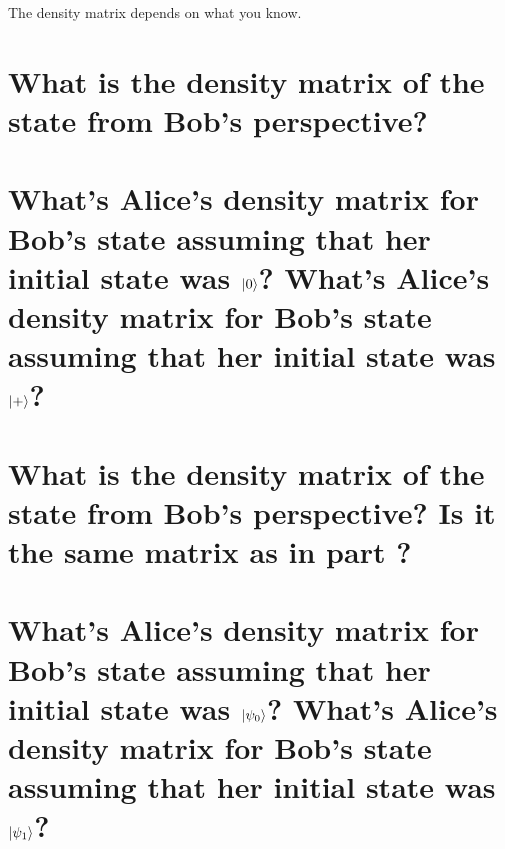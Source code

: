 \documentclass[boxes,pages]{homework}
\begin{document}
\begin{problem}
The density matrix depends on what you know.
\begin{parts}
	\part{What is the density matrix of the state from Bob's perspective?}\label{part:3a}
	\part{What's Alice's density matrix for Bob's state assuming that her initial state was $\ket{0}$? What's Alice's density matrix for Bob's state assuming that her initial state was $\ket{+}$?}\label{part:3b}
	\part{What is the density matrix of the state from Bob's perspective? Is it the same matrix as in part \ref{part:3a}?}\label{part:3c}
	\part{What's Alice's density matrix for Bob's state assuming that her initial state was $\ket{\psi_0}$? What's Alice's density matrix for Bob's state assuming that her initial state was $\ket{\psi_1}$?}\label{part:3d}
\end{parts}
\end{problem}
\end{document}

